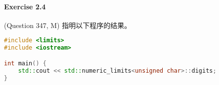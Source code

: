 \documentclass{article}
\begin{document}
	\paragraph*{Exercise 2.4} 
	
	(Question 347, M) 指明以下程序的结果。
	
	\begin{lstlisting}[language=C++]  		
#include <limits>
#include <iostream>

int main() {
	std::cout << std::numeric_limits<unsigned char>::digits;
}
	\end{lstlisting}
	
\end{document}
